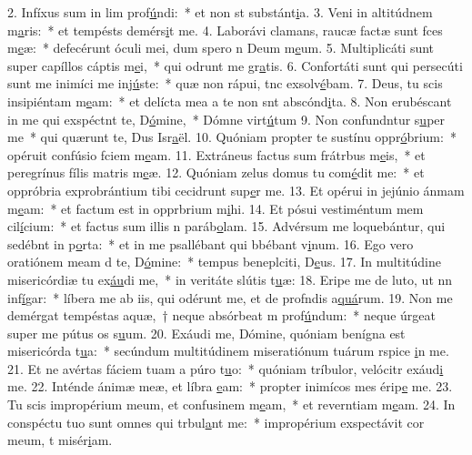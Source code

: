 2. Infíxus sum in lim prof\uline{ú}ndi:~* et non st substánt\uline{i}a.
3. Veni in altitúdnem m\uline{a}ris:~* et tempésts demérs\uline{i}t me.
4. Laborávi clamans, raucæ factæ sunt fces m\uline{e}æ:~* defecérunt óculi mei, dum spero n Deum m\uline{e}um.
5. Multiplicáti sunt super capíllos cáptis m\uline{e}i,~* qui odrunt me gr\uline{a}tis.
6. Confortáti sunt qui persecúti sunt me inimíci me inj\uline{ú}ste:~* quæ non rápui, tnc exsolv\uline{é}bam.
7. Deus, tu scis insipiéntam m\uline{e}am:~* et delícta mea a te non snt abscónd\uline{i}ta.
8. Non erubéscant in me qui exspéctnt te, D\uline{ó}mine,~* Dómne virt\uline{ú}tum
9. Non confundntur s\uline{u}per me~* qui quærunt te, Dus Isr\uline{a}ël.
10. Quóniam propter te sustínu oppr\uline{ó}brium:~* opéruit confúsio fciem m\uline{e}am.
11. Extráneus factus sum frátrbus m\uline{e}is,~* et peregrínus fílis matris m\uline{e}æ.
12. Quóniam zelus domus tu com\uline{é}dit me:~* et oppróbria exprobrántium tibi cecidrunt sup\uline{e}r me.
13. Et opérui in jejúnio ánmam m\uline{e}am:~* et factum est in opprbrium m\uline{i}hi.
14. Et pósui vestiméntum mem cil\uline{í}cium:~* et factus sum illis n paráb\uline{o}lam.
15. Advérsum me loquebántur, qui sedébnt in p\uline{o}rta:~* et in me psallébant qui bbébant v\uline{i}num.
16. Ego vero oratiónem meam d te, D\uline{ó}mine:~* tempus beneplciti, D\uline{e}us.
17. In multitúdine misericórdiæ tu ex\uline{áu}di me,~* in veritáte slútis t\uline{u}æ:
18. Eripe me de luto, ut nn inf\uline{í}gar:~* líbera me ab iis, qui odérunt me, et de profndis a\uline{quá}rum.
19. Non me demérgat tempéstas aquæ,~† neque absórbeat m prof\uline{ú}ndum:~* neque úrgeat super me pútus os s\uline{u}um.
20. Exáudi me, Dómine, quóniam benígna est misericórda t\uline{u}a:~* secúndum multitúdinem miseratiónum tuárum rspice \uline{i}n me.
21. Et ne avértas fáciem tuam a púro t\uline{u}o:~* quóniam tríbulor, velócitr exáud\uline{i} me.
22. Inténde ánimæ meæ, et líbra \uline{e}am:~* propter inimícos mes érip\uline{e} me.
23. Tu scis impropérium meum, et confusinem m\uline{e}am,~* et reverntiam m\uline{e}am.
24. In conspéctu tuo sunt omnes qui trbul\uline{a}nt me:~* impropérium exspectávit cor meum, t misér\uline{i}am.
